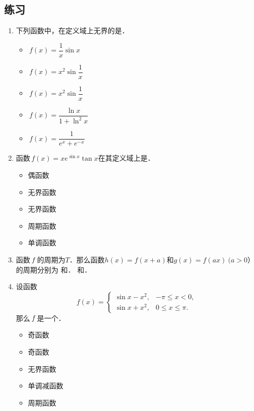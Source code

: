 \ifshowex
{}
\subsection*{练习}

\begin{enumerate}
\item 下列函数中，在定义域上无界的是\uline{\makebox[4em]{}}．
  \begin{itemize}
    \renewcommand{\labelitemi}{\faCircleThin}
  \item \(\,f(x) = \dfrac1x \sin x\)
    \ifshowsol
    \item[\faCircle] \(\,f(x) = x^2 \sin \dfrac1x\)
    \else
    \item \(\,f(x) = x^2 \sin \dfrac1x\)
    \fi
  \item \(\,f(x) = \dfrac{\ln x}{1 + \ln^2 x}\)
  \item \(\,f(x) = \dfrac1{e^x + e^{-x}}\)
  \end{itemize}

\item 函数\(\,f(x) = x e^{\sin x} \tan x\)在其定义域上是\uline{\makebox[3em]{}}．
  \begin{itemize}
    \renewcommand{\labelitemi}{\faCircleThin}
  \item 偶函数
    \ifshowsol
    \item[\faCircle] 无界函数
    \else
    \item 无界函数
    \fi
  \item 周期函数
  \item 单调函数
  \end{itemize}

\item 函数\(\,f\mkern2mu\)的周期为\(T\)．那么函数\(h(x) = f(x+a)\)和\(g(x) = f(ax)\ (a > 0）\)的周期分别为
  \ifshowsol
    \uline{}和\uline{}．
  \else
    \uline{\makebox[3em]{}}和\uline{\makebox[3em]{}}．
  \fi

\item 设函数
  \[
    f(x) =
    \begin{cases}
      \sin x - x^2, & -\pi \le x < 0, \\
      \sin x + x^2, & 0 \le x \le \pi.
    \end{cases}
  \]
  那么\(\,f\mkern2mu\)是一个\uline{\makebox[4em]{}}．
  \begin{itemize}
    \renewcommand{\labelitemi}{\faCircleThin}
    \ifshowsol
    \item[\faCircle] 奇函数
    \else
    \item 奇函数
    \fi
  \item 无界函数
  \item 单调减函数
  \item 周期函数
  \end{itemize}


\end{enumerate}
